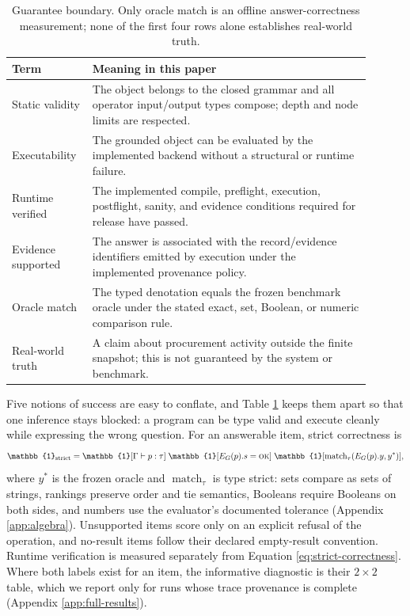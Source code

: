 \begin{table}[t]
  \caption{Guarantee boundary.  Only oracle match is an offline answer-correctness measurement;
  none of the first four rows alone establishes real-world truth.}
  \label{tab:guarantee-boundary}
  \centering
  \small
  \begin{tabular}{p{0.18\linewidth}p{0.72\linewidth}}
    \toprule
    Term & Meaning in this paper \\
    \midrule
    Static validity & The object belongs to the closed grammar and all operator input/output
    types compose; depth and node limits are respected. \\
    Executability & The grounded object can be evaluated by the implemented backend without a
    structural or runtime failure. \\
    Runtime verified & The implemented compile, preflight, execution, postflight, sanity, and
    evidence conditions required for release have passed. \\
    Evidence supported & The answer is associated with the record/evidence identifiers emitted
    by execution under the implemented provenance policy. \\
    Oracle match & The typed denotation equals the frozen benchmark oracle under the stated
    exact, set, Boolean, or numeric comparison rule. \\
    Real-world truth & A claim about procurement activity outside the finite snapshot; this is
    not guaranteed by the system or benchmark. \\
    \bottomrule
  \end{tabular}
\end{table}

Five notions of success are easy to conflate, and Table \ref{tab:guarantee-boundary} keeps them
apart so that one inference stays blocked: a program can be type valid and execute cleanly while
expressing the wrong question.  For an answerable item, strict correctness is
\begin{equation}
  \mathbb{1}_{\mathrm{strict}} =
  \mathbb{1}[\Gamma\vdash p:\tau]\;
  \mathbb{1}[E_G(p).s=\textsc{ok}]\;
  \mathbb{1}[\operatorname{match}_{\tau}(E_G(p).y,y^*)],
  \label{eq:strict-correctness}
\end{equation}
where $y^*$ is the frozen oracle and $\operatorname{match}_{\tau}$ is type strict: sets compare as
sets of strings, rankings preserve order and tie semantics, Booleans require Booleans on both
sides, and numbers use the evaluator's documented tolerance (Appendix \ref{app:algebra}).
Unsupported items score only on an explicit refusal of the operation, and no-result items follow
their declared empty-result convention.  Runtime verification is measured separately from
Equation \ref{eq:strict-correctness}.  Where both labels exist for an item, the informative
diagnostic is their $2\times2$ table, which we report only for runs whose trace provenance is
complete (Appendix \ref{app:full-results}).
